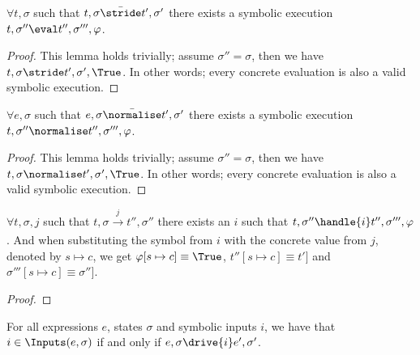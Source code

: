 \begin{lemma}
  $\forall t,\sigma$ such that $t,\sigma \bar{\stride}t',\sigma'$
  there exists a symbolic execution $t,\sigma''\eval t'',\sigma''',\phi$.
\end{lemma}

\begin{proof}
This lemma holds trivially; assume $\sigma''=\sigma$, then we have $t,\sigma\stride t',\sigma',\True$.
In other words; every concrete evaluation is also a valid symbolic execution.
\end{proof}

\begin{lemma}
  $\forall e,\sigma$ such that $e,\sigma \bar{\normalise}t',\sigma'$
  there exists a symbolic execution $t,\sigma''\normalise t'',\sigma''',\phi$.
\end{lemma}

\begin{proof}
This lemma holds trivially; assume $\sigma''=\sigma$, then we have $t,\sigma\normalise t',\sigma',\True$.
In other words; every concrete evaluation is also a valid symbolic execution.
\end{proof}

\begin{lemma}
  $\forall t,\sigma,j$ such that $t,\sigma \xrightarrow[]{j} t'',\sigma''$
  there exists an $i$ such that $t,\sigma''\handle{i} t'',\sigma''',\phi$. And when substituting the symbol from $i$ with the concrete value from $j$, denoted by $s\mapsto c$, we get $\phi[s\mapsto c]\equiv\True$, $t''[s\mapsto c]\equiv t']$ and $\sigma'''[s\mapsto c]\equiv\sigma'']$.
\end{lemma}

\begin{proof}
\end{proof}

\begin{lemma}
\end{lemma}

\begin{lemma}
  \label{lem:safei}
  For all expressions $e$, states $\sigma$ and symbolic inputs $i$, we have that
  $i\in\Inputs(e,\sigma)$ if and only if $e,\sigma\drive{i}e',\sigma'$.
\end{lemma}

